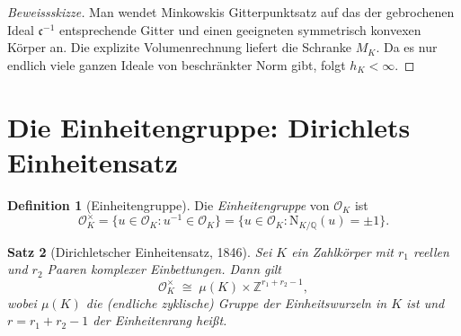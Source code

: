 \documentclass[12pt,a4paper]{amsart}
\newtheorem{theorem}{Satz}[section]
\theoremstyle{definition}
\newtheorem{definition}[theorem]{Definition}
\newcommand{\Z}{\mathbb{Z}}
\newcommand{\Q}{\mathbb{Q}}
\newcommand{\OK}{\mathcal{O}_K}
\begin{document}
\begin{proof}[Beweissskizze]
Man wendet Minkowskis Gitterpunktsatz auf das der gebrochenen Ideal
$\mathfrak{c}^{-1}$ entsprechende Gitter und einen geeigneten symmetrisch
konvexen Körper an.  Die explizite Volumenrechnung liefert die Schranke $M_K$.
Da es nur endlich viele ganzen Ideale von beschränkter Norm gibt, folgt
$h_K < \infty$.
\end{proof}

\section{Die Einheitengruppe: Dirichlets Einheitensatz}

\begin{definition}[Einheitengruppe]
Die \emph{Einheitengruppe} von $\OK$ ist
\[
  \OK^\times = \{u \in \OK : u^{-1} \in \OK\}
  = \{u \in \OK : \mathrm{N}_{K/\Q}(u) = \pm 1\}.
\]
\end{definition}

\begin{theorem}[Dirichletscher Einheitensatz, 1846]
\label{thm:einheitensatz}
Sei $K$ ein Zahlkörper mit $r_1$ reellen und $r_2$ Paaren komplexer
Einbettungen.  Dann gilt
\[
  \OK^\times \;\cong\; \mu(K) \times \Z^{r_1 + r_2 - 1},
\]
wobei $\mu(K)$ die (endliche zyklische) Gruppe der Einheitswurzeln in $K$
ist und $r = r_1 + r_2 - 1$ der \emph{Einheitenrang} heißt.
\end{theorem}
\end{document}
